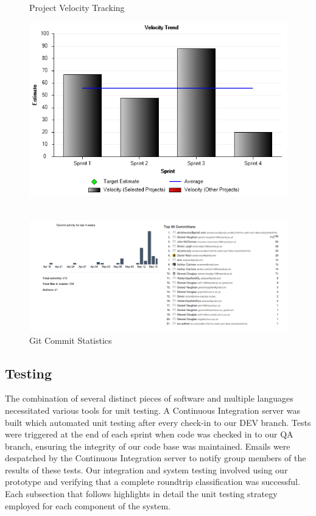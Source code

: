 \documentclass[a4paper,11pt]{article}
\begin{document}
\begin{figure}[htb!]
	\centering
	\caption{Project Velocity Tracking}
	\includegraphics[width=0.80\linewidth]{images/VelocityTrend.png}\\\\
	\caption{Git Commit Statistics}
		\includegraphics[width=0.80\linewidth]{images/GitCommits.png}

\end{figure}
\clearpage

\subsection{Testing}

The combination of several distinct pieces of software and multiple languages necessitated various tools for unit testing. A Continuous Integration server was built which automated unit testing after every check-in to our DEV branch. Tests were triggered at the end of each sprint when code was checked in to our QA branch, ensuring the integrity of our code base was maintained. Emails were despatched by the Continuous Integration server to notify group members of the results of these tests. Our integration and system testing involved using our prototype and verifying that a complete roundtrip classification was successful. Each subsection that follows highlights in detail the unit testing strategy employed for each component of the system. 
\end{document}
